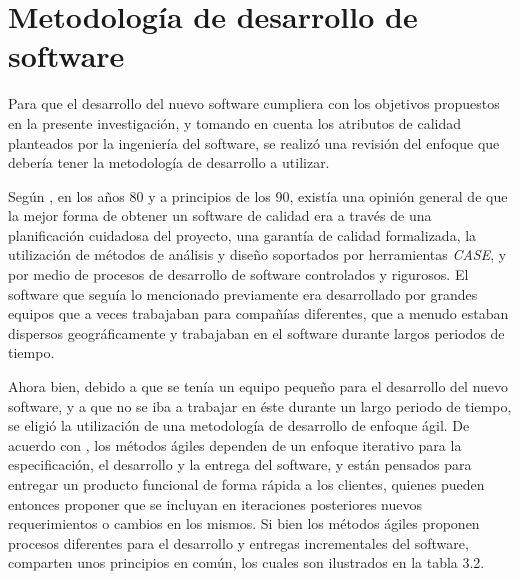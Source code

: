 \vspace*{0.5 cm}

	\section{Metodolog\'{i}a de desarrollo de software}
Para que el desarrollo del nuevo software cumpliera con los objetivos propuestos en la presente investigaci\'{o}n, y tomando en cuenta los atributos de calidad planteados por la ingenier\'{i}a del software, se realiz\'{o} una revisi\'{o}n del enfoque que deber\'{i}a tener la metodolog\'{i}a de desarrollo a utilizar.

Seg\'{u}n , en los a\~{n}os 80 y a principios de los 90, exist\'{i}a una opini\'{o}n general de que la mejor forma de obtener un software de calidad era a trav\'{e}s de una planificaci\'{o}n cuidadosa del proyecto, una garant\'{i}a de calidad formalizada, la utilizaci\'{o}n de m\'{e}todos de an\'{a}lisis y dise\~{n}o soportados por herramientas \textit{CASE}, y por medio de procesos de desarrollo de software controlados y rigurosos. El software que segu\'{i}a lo mencionado previamente era desarrollado por grandes equipos que a veces trabajaban para compa\~{n}\'{i}as diferentes, que a menudo estaban dispersos geogr\'{a}ficamente y trabajaban en el software durante largos periodos de tiempo.

Ahora bien, debido a que se ten\'{i}a un equipo peque\~{n}o para el desarrollo del nuevo software, y a que no se iba a trabajar en \'{e}ste durante un largo periodo de tiempo, se eligi\'{o} la utilizaci\'{o}n de una metodolog\'{i}a de desarrollo de enfoque \'{a}gil. De acuerdo con , los m\'{e}todos \'{a}giles dependen de un enfoque iterativo para la especificaci\'{o}n, el desarrollo y la entrega del software, y est\'{a}n pensados para entregar un producto funcional de forma r\'{a}pida a los clientes, quienes pueden entonces proponer que se incluyan en iteraciones posteriores nuevos requerimientos o cambios en los mismos. Si bien los m\'{e}todos \'{a}giles proponen procesos diferentes para el desarrollo y entregas incrementales del software, comparten unos principios en com\'{u}n, los cuales son ilustrados en la tabla 3.2.

